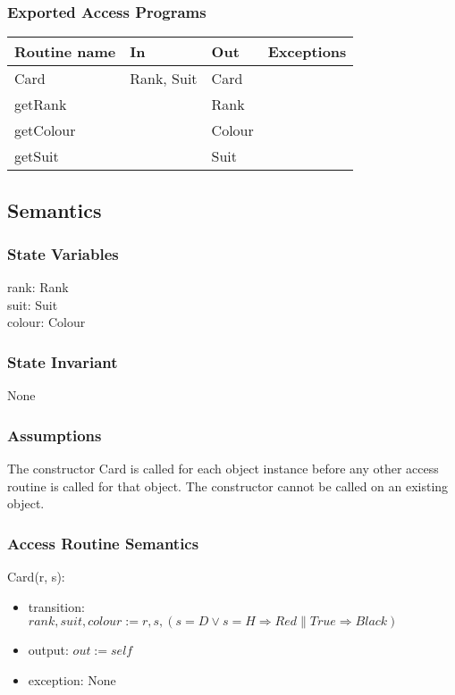 \documentclass[12pt]{article}
\begin{document}
\subsubsection* {Exported Access Programs}

\begin{tabular}{| l | l | l | l |}
\hline
\textbf{Routine name} & \textbf{In} & \textbf{Out} & \textbf{Exceptions}\\
\hline
Card& Rank, Suit & Card & \\
\hline
getRank & ~ & Rank & ~\\
\hline
getColour & ~ & Colour & ~\\
\hline
getSuit & ~ & Suit & ~\\
\hline
\end{tabular}

\subsection* {Semantics}

\subsubsection* {State Variables}

rank: Rank\\
suit: Suit\\
colour: Colour\\

\subsubsection* {State Invariant}

None

\subsubsection* {Assumptions}

The constructor Card is called for each object instance before any other
access routine is called for that object.  The constructor cannot be called on
an existing object.

\subsubsection* {Access Routine Semantics}

Card(r, s):
\begin{itemize}
\item transition: $rank, suit, colour := r, s,(s = D \lor s = H \Rightarrow  Red \| True \Rightarrow  Black)$
\item output: $out := \mathit{self}$
\item exception: None
\end{itemize}
\end{document}
